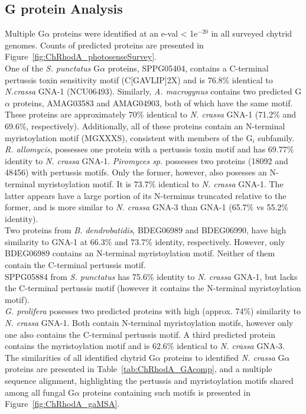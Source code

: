 \subsection*{G protein Analysis}
Multiple G$\alpha$ proteins were identified at an e-val < 1e$^{-20}$ in all surveyed chytrid genomes. Counts of predicted proteins are presented in Figure~\ref{fig:ChRhodA_photosenseSurvey}.\\
\indent One of the \textit{S. punctatus} G$\alpha$ proteins, SPPG05404, contains a C-terminal pertussis toxin sensitivity motif (C[GAVLIP]{2}X) and is 76.8\% identical to \textit{N.crassa} GNA-1 (NCU06493). Similarly, \textit{A. macrogynus} contains two predicted G$\alpha$ proteins, AMAG03583 and AMAG04903, both of which have the same motif. These proteins are approximately 70\% identical to \textit{N. crassa} GNA-1 (71.2\% and 69.6\%, respectively). Additionally, all of these proteins contain an N-terminal myristoylation motif (MGXXXS), consistent with members of the G$_{i}$ subfamily. \textit{R. allomycis}, possesses one protein with a pertussis toxin motif and has 69.77\% identity to \textit{N. crassa} GNA-1. \textit{Piromyces sp.} possesses two proteins (18092 and 48456) with pertussis motifs. Only the former, however, also posesses an N-terminal myristoylation motif. It is 73.7\% identical to \textit{N. crassa} GNA-1. The latter appears have a large portion of its N-terminus truncated relative to the former, and is more similar to \textit{N. crassa} GNA-3 than GNA-1 (65.7\% vs 55.2\% identity).\\
\indent Two proteins from \textit{B. dendrobatidis}, BDEG06989 and BDEG06990, have high similarity to GNA-1 at 66.3\% and 73.7\% identity, respectively. However, only BDEG06989 contains an N-terminal myristoylation motif. Neither of them contain the C-terminal pertussis motif.\\
\indent SPPG05884 from \textit{S. punctatus} has 75.6\% identity to \textit{N. crassa} GNA-1, but lacks the C-terminal pertussis motif (however it contains the N-terminal myristoylation motif).\\
\indent \textit{G. prolifera} posesses two predicted proteins with high (approx. 74\%) similarity to \textit{N. crassa} GNA-1. Both contain N-terminal myristoylation motifs, however only one also contains the C-terminal pertussis motif. A third predicted protein contains the myristoylation motif and is 62.6\% identical to \textit{N. crassa} GNA-3.\\
\indent The similarities of all identified chytrid G$\alpha$ proteins to identified \textit{N. crassa} G$\alpha$ proteins are presented in Table~\ref{tab:ChRhodA_GAcomp}, and a multiple sequence alignment, highlighting the pertussis and myristoylation motifs shared among all fungal G$\alpha$ proteins containing such motifs is presented in Figure~\ref{fig:ChRhodA_gaMSA}.\\
